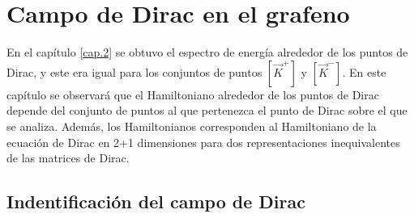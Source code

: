 \chapter{Campo de Dirac en el grafeno}
En el capítulo \ref{cap.2} se obtuvo el espectro de energía alrededor de los puntos de Dirac, y este era igual para los conjuntos de puntos $[\vec{K}^{+}]$ y $[\vec{K}^{-}]$. En este capítulo se observará que el Hamiltoniano alrededor de los puntos de Dirac depende del conjunto de puntos al que pertenezca el punto de Dirac sobre el que se analiza. Además, los Hamiltonianos corresponden al Hamiltoniano de la ecuación de Dirac en 2+1 dimensiones para dos representaciones inequivalentes de las matrices de Dirac.
\section{Indentificación del campo de Dirac}

